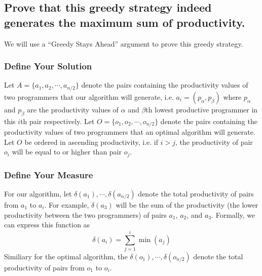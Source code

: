 \documentclass[11pt]{scrartcl}
\begin{document}
\subsection{
	Prove that this greedy strategy indeed generates the maximum sum of
	productivity.
}
We will use a “Greedy Stays Ahead” argument to prove this greedy strategy.
\subsubsection{
	Define Your Solution
}
Let $A=\{a_1, a_2, \cdots, a_{n/2}\}$ denote the pairs containing the productivity values of two programmers
that our algorithm will generate, i.e. $a_i = (p_\alpha, p_\beta)$ where $p_\alpha$ and $p_\beta$ are the
productivity values of $\alpha$ and $\beta$th lowest productive programmer in this $i$th pair respectively.
Let $O = \{o_1, o_2, \cdots, o_{n/2}\}$ denote the pairs containing the productivity values of two programmers
that an optimal algorithm will generate. Let $O$ be ordered in ascending productivity, i.e. if $i>j$,
the productivity of pair $o_i$ will be equal to or higher than pair $o_j$.
\subsubsection{
	Define Your Measure
}
For our algorithm, let $\delta(a_1), \cdots, \delta(a_{n/2})$ denote the total productivity of pairs
from $a_1$ to $a_i$. For example, $\delta(a_3)$ will be the sum of the productivity (the
lower productivity between the two programmers) of pairs $a_1$, $a_2$, and $a_3$.
Formally, we can express this function as
$$\delta(a_i) = \sum_{j=1}^i \min(a_j)$$
Similiary for the optimal algorithm, the $\delta(o_1), \cdots, \delta(o_{n/2})$ denote
the total productivity of pairs from $o_1$ to $o_i$.
\end{document}
